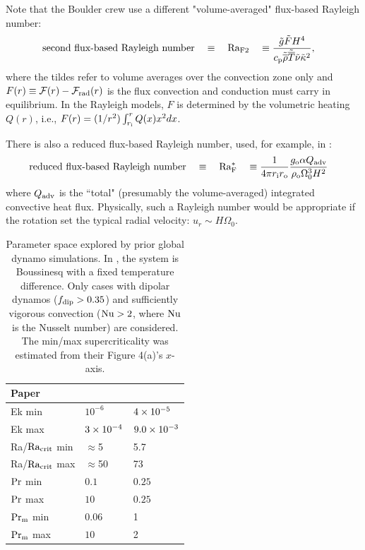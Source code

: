 \documentclass[12pt]{article} %
\begin{document}
Note that the Boulder crew  \citep{Featherstone2016a, Featherstone2016b, Hindman2020, Matilsky2020a, Matilsky2020b, Korre2021, Camisassa2022} use a different "volume-averaged" flux-based Rayleigh number: 
\begin{align}
	\text{second flux-based Rayleigh number} \quad & \equiv \quad {\rm{Ra_{F2}}} \quad \equiv \frac{\tilde{g}\tilde{F}H^4}{c_{\rm{p}}\tilde{\overline{\rho}}\tilde{\overline{T}}\tilde{\nu}\tilde{\kappa}^2},
\end{align}
where the tildes refer to volume averages over the convection zone only and $F(r)\equiv{\mathcal{F}}(r)-{\mathcal{F}}_{\rm{rad}}(r)$ is the flux convection and conduction must carry in equilibrium. In the Rayleigh models, $F$ is determined by the volumetric heating $Q(r)$, i.e., $F(r)=(1/r^2)\int_{r_{\rm{i}}}^rQ(x)x^2dx$. 

There is also a reduced flux-based Rayleigh number, used, for example, in \citet{Christensen2006}:
\begin{align}
	\text{reduced flux-based Rayleigh number} \quad & \equiv \quad {\rm{Ra^*_F}} \quad \equiv \frac{1}{4\pi r_{\rm{i}}r_{\rm{o}}} \frac{g_{\rm{o}}\alpha Q_{\rm{adv}} }{\rho_{\rm{o}}\Omega_0^3H^2}
\end{align}
where $Q_{\rm{adv}}$ is the ``total" (presumably the volume-averaged) integrated convective heat flux. Physically, such a Rayleigh number would be appropriate if the rotation set the typical radial velocity: $u_r\sim H\Omega_0$. 

 \begin{table}
	\centering
	\caption{Parameter space explored by prior global dynamo simulations. In \citet{Christensen2006}, the system is Boussinesq with a fixed temperature difference. Only cases with dipolar dynamos ($f_{\rm{dip}}>0.35$) and sufficiently vigorous convection (${\rm{Nu}}>2$, where $\rm{Nu}$ is the Nusselt number) are considered. The min/max supercriticality was estimated from their Figure 4(a)'s $x$-axis.  }\label{tab:params}
	\begin{tabular}{l | l | l }
		\hline\hline
		Paper & \citet{Christensen2006} & \citet{Brun2022} \\
		\hline
		Ek min & $10^{-6}$ & $4\times10^{-5}$\\
		Ek max & $3\times10^{-4}$ & $9.0\times10^{-3}$ \\
		\hline
		Ra/$\rm{Ra_{crit}}$ min & $\approx$5 & 5.7 \\
		Ra/$\rm{Ra_{crit}}$ max & $\approx$50 & 73\\
		\hline
		$\rm{Pr}$ min & $0.1$ & $0.25$ \\
		$\rm{Pr}$ max & $10$ & $0.25$ \\
		\hline
		$\rm{Pr_m}$ min & $0.06$ & 1 \\
		$\rm{Pr_m}$ max & $10$ & 2 \\
		\hline
	\end{tabular}
\end{table}
		
\end{document}
